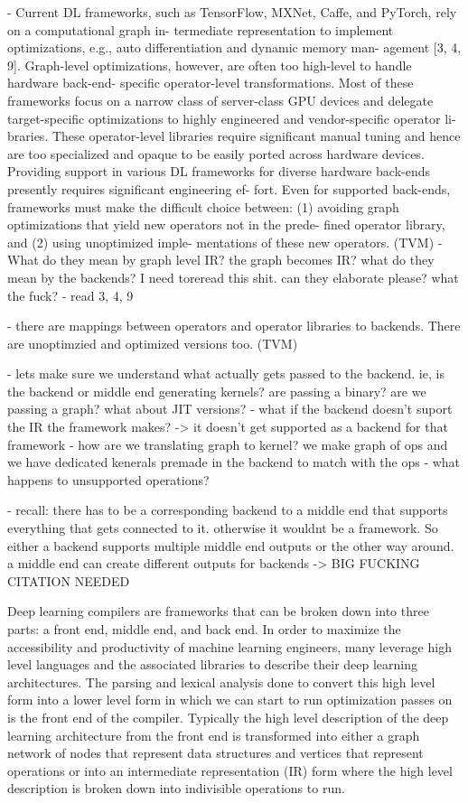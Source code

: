 - Current DL frameworks, such as TensorFlow, MXNet, Caffe, and PyTorch, rely on a
computational graph in- termediate representation to implement optimizations,
e.g., auto differentiation and dynamic memory man- agement [3, 4, 9].
Graph-level optimizations, however, are often too high-level to handle hardware
back-end- specific operator-level transformations. Most of these frameworks
focus on a narrow class of server-class GPU devices and delegate
target-specific optimizations to highly engineered and vendor-specific operator
li- braries. These operator-level libraries require significant manual tuning
and hence are too specialized and opaque to be easily ported across hardware
devices. Providing support in various DL frameworks for diverse hardware
back-ends presently requires significant engineering ef- fort. Even for
supported back-ends, frameworks must make the difficult choice between: (1)
avoiding graph optimizations that yield new operators not in the prede- fined
operator library, and (2) using unoptimized imple- mentations of these new
operators. (TVM)
	- What do they mean by graph level IR? the graph becomes IR? what do
	they mean by the backends? I need toreread this shit. can they
	elaborate please? what the fuck?
	- read 3, 4, 9

- there are mappings between operators and operator libraries to backends. There
are unoptimzied and optimized versions too.  (TVM)


- lets make sure we understand what actually gets passed to the backend. ie, is
the backend or middle end generating kernels? are passing a binary? are we
passing a graph? what about JIT versions?
- what if the backend doesn't suport the IR the framework makes? -> it doesn't get  supported as a backend for that framework
- how are we translating graph to kernel? we make graph of ops and we have
dedicated kenerals premade in the backend to match with the ops
- what happens to unsupported operations?

- recall: there has to be a corresponding backend to a middle end that supports everything that gets connected to it. otherwise it wouldnt be a framework. So either a backend supports multiple middle end outputs or the other way around. a middle end can create different outputs for backends -> BIG FUCKING CITATION NEEDED

Deep learning compilers are frameworks that can be broken down into three
parts: a front end, middle end, and back end. In order to maximize the
accessibility and productivity of machine learning engineers, many leverage
high level languages and the associated libraries to describe their deep
learning architectures. The parsing and lexical analysis done to convert this
high level form into a lower level form in which we can start to run
optimization passes on is the front end of the compiler. Typically the high
level description of the deep learning architecture from the front end is
transformed into either a graph network of nodes that represent data structures
and vertices that represent operations \cite{tensorflow} \cite{onsram} or into
an intermediate representation (IR) \cite{onnx} \cite{DLVM} \cite{nGraph}
form where the high level description is broken down into indivisible
operations to run.

